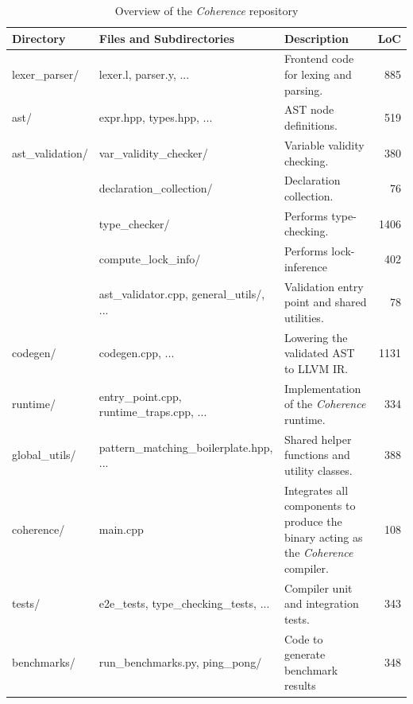 \begin{table}[H]
\centering
\small
\caption{Overview of the \textit{Coherence} repository}
\label{tab:repo-overview}
\begin{tabular}{l | l | p{6cm} | r}
\toprule
\textbf{Directory} & \textbf{Files and Subdirectories} & \textbf{Description} & \textbf{LoC} \\ \midrule
lexer\_parser/ & lexer.l, parser.y, ... & Frontend code for lexing and parsing. & 885 \\ \midrule
ast/ & expr.hpp, types.hpp, ...  & AST node definitions. & 519 \\ \midrule
 ast\_validation/ & var\_validity\_checker/ & Variable validity checking. & 380 \\ 
 & declaration\_collection/ & Declaration collection. & 76 \\
 & type\_checker/ & Performs type-checking. & 1406 \\ 
 & compute\_lock\_info/ & Performs lock-inference & 402 \\
 & ast\_validator.cpp, general\_utils/, ... & Validation entry point and shared utilities. & 78 \\ \midrule
codegen/ & codegen.cpp, ... & Lowering the validated AST to LLVM IR. & 1131 \\ \midrule
runtime/ & entry\_point.cpp, runtime\_traps.cpp, ... & Implementation of the \textit{Coherence} runtime. & 334 \\ \midrule
global\_utils/ & pattern\_matching\_boilerplate.hpp, ... & Shared helper functions and utility classes. & 388 \\ \midrule
coherence/ & main.cpp & Integrates all components to produce the binary acting as the \textit{Coherence} compiler. & 108 \\ \midrule
tests/ & e2e\_tests, type\_checking\_tests, ... & Compiler unit and integration tests. & 343 \\
\midrule
benchmarks/ & run\_benchmarks.py, ping\_pong/ & Code to generate benchmark results & 348 \\ \bottomrule
\end{tabular}
\end{table}